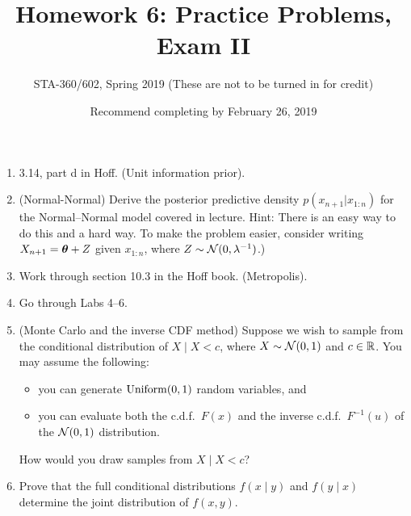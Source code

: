 \documentclass{article}
\begin{document}
\title{Homework 6: Practice Problems, Exam II}
\author{STA-360/602, Spring 2019 (These are not to be turned in for credit)}
\date{Recommend completing by February 26, 2019}
\maketitle




\begin{enumerate}
\item 3.14, part d in Hoff. (Unit information prior). 
\item (Normal-Normal)  Derive the posterior predictive density $p(x_{n +1}|x_{1:n})$ for the Normal--Normal model covered in lecture. Hint: There is an easy way to do this and a hard way. To make the problem easier, consider writing $X_{n+1} = {\bm\theta} + Z$ given $x_{1:n}$, where $Z\sim\mathcal{N}(0,\lambda^{-1})$.)
\item Work through section 10.3 in the Hoff book. (Metropolis). 
\item Go through Labs 4--6.
\item (Monte Carlo and the inverse CDF method) 
Suppose we wish to sample from the conditional distribution of $X\mid X<c$, where $X\sim\mathcal{N}(0,1)$ and $c\in \mathbb{R}$. You may assume the following:
\begin{itemize}
    \item you can generate $\operatorname*{Uniform}(0,1)$ random variables, and 
    \item you can evaluate both the c.d.f.\ $F(x)$ and the inverse c.d.f.\ $F^{-1}(u)$ of the $\mathcal{N}(0,1)$ distribution.
\end{itemize}
How would you draw samples from $X\mid X<c$?
\item Prove that the full conditional distributions $f(x \mid y)$ and $f(y \mid x)$ determine the joint distribution of $f(x,y).$
\end{enumerate}
\end{document}
